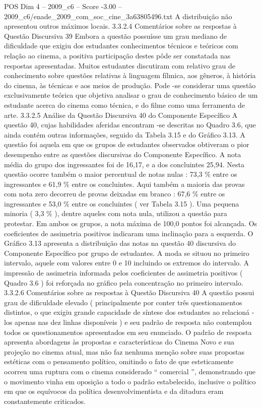 \begin{textsample}{POS Dim 4 – 2009\_c6 – Score -3.00 – 2009\_c6/enade\_2009\_com\_soc\_cine\_3a63805496.txt}
A distribuição não apresentou outros máximos locais. 3.3.2.4 Comentários sobre as respostas à Questão Discursiva 39 Embora a questão possuísse um grau mediano de dificuldade que exigiu dos estudantes conhecimentos técnicos e teóricos com relação ao cinema, a positiva participação destes pôde ser constatada nas respostas apresentadas.
Muitos estudantes discutiram com relativo grau de conhecimento sobre questões relativas à linguagem fílmica, aos gêneros, à história do cinema, às técnicas e aos meios de produção.
Pode -se considerar uma questão exclusivamente teórica que objetiva analisar o grau de conhecimento básico de um estudante acerca do cinema como técnica, e do filme como uma ferramenta de arte. 3.3.2.5 Análise da Questão Discursiva 40 do Componente Específico A questão 40, cujas habilidades aferidas encontram -se descritas no Quadro 3.6, que ainda contém outras informações, seguido da Tabela 3.15 e do Gráfico 3.13.
A questão foi aquela em que os grupos de estudantes observados obtiveram o pior desempenho entre as questões discursivas do Componente Específico.
A nota média do grupo dos ingressantes foi de 16,17, e a dos concluintes 25,94.
Nesta questão ocorre também o maior percentual de notas nulas : 73,3 \% entre os ingressantes e 61,9 \% entre os concluintes.
Aqui também a maioria das provas com nota zero decorreu de provas deixadas em branco : 67,6 \% entre os ingressantes e 53,0 \% entre os concluintes ( ver Tabela 3.15 ).
Uma pequena minoria ( 3,3 \% ), dentre aqueles com nota nula, utilizou a questão para protestar.
Em ambos os grupos, a nota máxima de 100,0 pontos foi alcançada.
Os coeficientes de assimetria positivos indicaram uma inclinação para a esquerda.
O Gráfico 3.13 apresenta a distribuição das notas na questão 40 discursiva do Componente Específico por grupo de estudantes.
A moda se situou no primeiro intervalo, aquele com valores entre 0 e 10 incluindo os extremos do intervalo.
A impressão de assimetria informada pelos coeficientes de assimetria positivos ( Quadro 3.6 ) foi reforçada no gráfico pela concentração no primeiro intervalo. 3.3.2.6 Comentários sobre as respostas à Questão Discursiva 40 A questão possui grau de dificuldade elevado ( principalmente por conter três questionamentos distintos, o que exigiu grande capacidade de síntese dos estudantes ao relacioná -los apenas nas dez linhas disponíveis ) e seu padrão de resposta não contemplou todos os questionamentos apresentados em seu enunciado.
O padrão de resposta apresenta abordagens às propostas e características do Cinema Novo e sua projeção no cinema atual, mas não faz nenhuma menção sobre suas propostas estéticas com o pensamento político, omitindo o fato de que esteticamente ocorreu uma ruptura com o cinema considerado “ comercial ”, demonstrando que o movimento vinha em oposição a todo o padrão estabelecido, inclusive o político em que os equívocos da política desenvolvimentista e da ditadura eram constantemente criticados.

\end{textsample}
